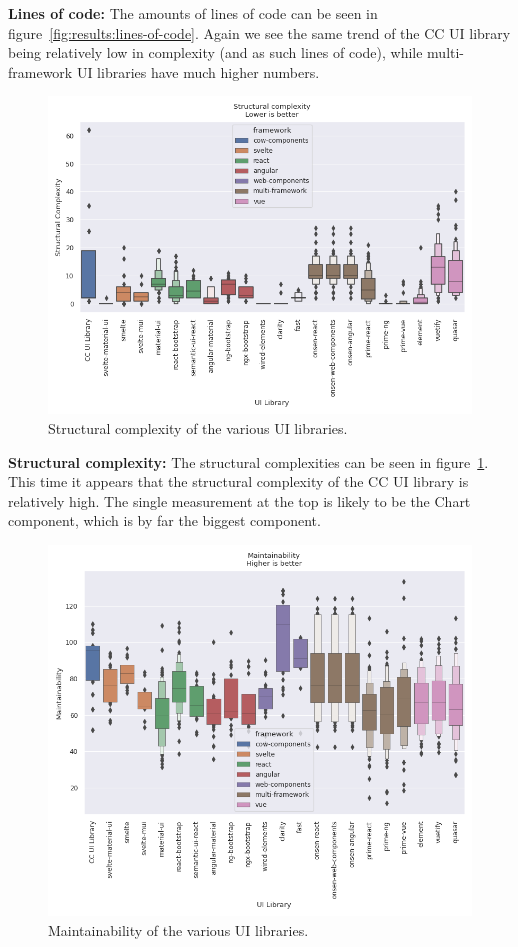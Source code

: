 \textbf{Lines of code:} The amounts of lines of code can be seen in figure~\ref{fig:results:lines-of-code}. Again we see the same trend of the CC UI library being relatively low in complexity (and as such lines of code), while multi-framework UI libraries have much higher numbers.

\begin{figure}[h]
	\includegraphics[width=\columnwidth]{plots/structural-complexity.png}
	\caption{Structural complexity of the various UI libraries.}
	\label{fig:results:structural-complexity}
	\centering
\end{figure}

\textbf{Structural complexity:} The structural complexities can be seen in figure~\ref{fig:results:structural-complexity}. This time it appears that the structural complexity of the CC UI library is relatively high. The single measurement at the top is likely to be the Chart component, which is by far the biggest component.

\begin{figure}[h]
	\includegraphics[width=\columnwidth]{plots/maintainability.png}
	\caption{Maintainability of the various UI libraries.}
	\label{fig:results:maintainabilty}
	\centering
\end{figure}


